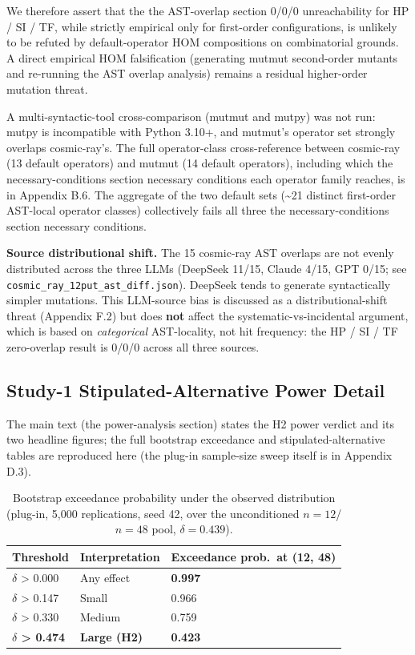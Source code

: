 \documentclass[manuscript,screen,review]{acmart}
\begin{document}
We therefore assert that the the AST-overlap section
0/0/0 unreachability for HP / SI / TF, while strictly empirical only for
first-order configurations, is unlikely to be refuted by default-operator HOM
compositions on combinatorial grounds. A direct empirical HOM falsification
(generating mutmut second-order mutants and re-running the AST overlap analysis)
remains a residual higher-order mutation threat.

A multi-syntactic-tool cross-comparison (mutmut and mutpy) was not run: mutpy is
incompatible with Python 3.10+, and mutmut's operator set strongly overlaps
cosmic-ray's. The full operator-class cross-reference between cosmic-ray (13
default operators) and mutmut (14 default operators), including which
the necessary-conditions section necessary
conditions each operator family reaches, is in Appendix B.6. The aggregate of the
two default sets (\textasciitilde21 distinct first-order AST-local operator
classes) collectively fails all three
the necessary-conditions section necessary
conditions.

\textbf{Source distributional shift.} The 15 cosmic-ray AST overlaps are not
evenly distributed across the three LLMs (DeepSeek 11/15, Claude 4/15, GPT 0/15;
see \texttt{cosmic\_ray\_12put\_ast\_diff.json}). DeepSeek tends to generate
syntactically simpler mutations. This LLM-source bias is discussed as a
distributional-shift threat (Appendix F.2) but does \textbf{not} affect the
systematic-vs-incidental argument, which is based on \emph{categorical}
AST-locality, not hit frequency: the HP / SI / TF zero-overlap result is 0/0/0
across all three sources.

\subsection{Study-1 Stipulated-Alternative Power Detail}\label{k.4-power-detail}

The main text (the power-analysis section) states the H2
power verdict and its two headline figures; the full bootstrap exceedance and
stipulated-alternative tables are reproduced here (the plug-in sample-size sweep
itself is in Appendix D.3).

{%
\begin{longtable}[]{@{}lll@{}}
\caption{Bootstrap exceedance probability under the observed distribution
(plug-in, 5,000 replications, seed 42, over the unconditioned $n=12$/$n=48$ pool,
$\delta=0.439$).}\label{tab:power-exceedance-full}\\
\toprule\noalign{}
Threshold & Interpretation & Exceedance prob.\ at (12, 48) \\
\midrule\noalign{}
\endhead
\bottomrule\noalign{}
\endlastfoot
$\delta$ \textgreater{} 0.000 & Any effect & \textbf{0.997} \\
$\delta$ \textgreater{} 0.147 & Small & 0.966 \\
$\delta$ \textgreater{} 0.330 & Medium & 0.759 \\
\textbf{$\delta$ \textgreater{} 0.474} & \textbf{Large (H2)} & \textbf{0.423} \\
\end{longtable}
}
\end{document}
